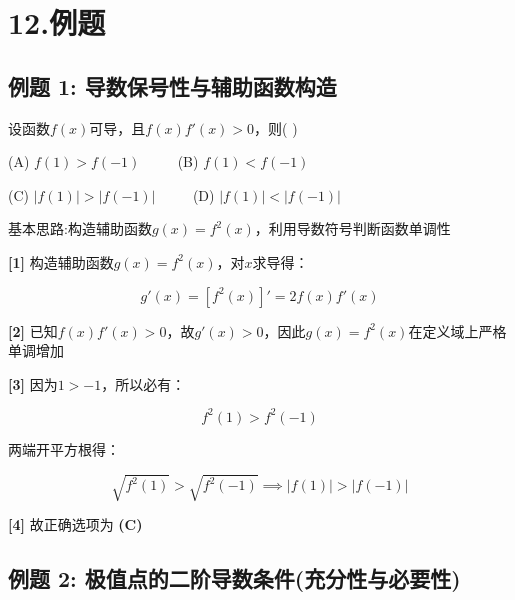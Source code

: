 \documentclass[11pt,a4paper,UTF8]{ctexart}
\begin{document}
\pagestyle{fancy}
\fancyhf{}
\fancyhead[R]{\small\color{TitlePurple}\nouppercase{\leftmark}}
\renewcommand{\headrulewidth}{0.5pt}

\tableofcontents
\newpage
{}


\section{12.例题}


\subsection{例题 1: 导数保号性与辅助函数构造}

设函数$f(x)$可导，且$f(x)f'(x) > 0$，则( )

(A) $f(1) > f(-1)$ $\qquad$ (B) $f(1) < f(-1)$

(C) $\vert{}f(1)\vert{} > \vert{}f(-1)\vert{}$ $\qquad$ (D) $\vert{}f(1)\vert{} < \vert{}f(-1)\vert{}$

基本思路:构造辅助函数$g(x) = f^2(x)$，利用导数符号判断函数单调性

\begin{solbox}[分步推导与答题规范]
\textbf{[1]} 构造辅助函数$g(x) = f^2(x)$，对$x$求导得：


\begin{equation*}
g'(x) = [f^2(x)]' = 2f(x)f'(x)
\end{equation*}


\textbf{[2]} 已知$f(x)f'(x) > 0$，故$g'(x) > 0$，因此$g(x) = f^2(x)$在定义域上严格单调增加

\textbf{[3]} 因为$1 > -1$，所以必有：


\begin{equation*}
f^2(1) > f^2(-1)
\end{equation*}


两端开平方根得：


\begin{equation*}
\sqrt{f^2(1)} > \sqrt{f^2(-1)} \implies \vert{}f(1)\vert{} > \vert{}f(-1)\vert{}
\end{equation*}


\textbf{[4]} 故正确选项为 \textbf{(C)}
\end{solbox}


\subsection{例题 2: 极值点的二阶导数条件(充分性与必要性)}
\end{document}
